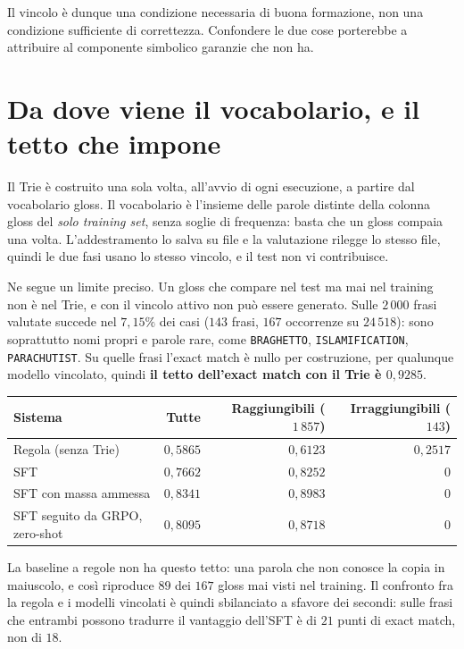 Il vincolo è dunque una condizione necessaria di buona formazione, non una
condizione sufficiente di correttezza. Confondere le due cose porterebbe a
attribuire al componente simbolico garanzie che non ha.

\section{Da dove viene il vocabolario, e il tetto che impone}
\label{sec:tetto-vocabolario}

Il Trie è costruito una sola volta, all'avvio di ogni esecuzione, a partire dal
vocabolario gloss. Il vocabolario è l'insieme delle parole distinte della colonna
gloss del \emph{solo training set}, senza soglie di frequenza: basta che un gloss
compaia una volta. L'addestramento lo salva su file e la valutazione rilegge lo
stesso file, quindi le due fasi usano lo stesso vincolo, e il test non vi
contribuisce.

Ne segue un limite preciso. Un gloss che compare nel test ma mai nel training non
è nel Trie, e con il vincolo attivo non può essere generato. Sulle $2\,000$ frasi
valutate succede nel $7{,}15\%$ dei casi ($143$ frasi, $167$ occorrenze su
$24\,518$): sono soprattutto nomi propri e parole rare, come \texttt{BRAGHETTO},
\texttt{ISLAMIFICATION}, \texttt{PARACHUTIST}. Su quelle frasi l'exact match è
nullo per costruzione, per qualunque modello vincolato, quindi \textbf{il tetto
dell'exact match con il Trie è $0{,}9285$}.

\begin{center}
\begin{tabular}{lrrr}
\toprule
Sistema & Tutte & Raggiungibili ($1\,857$) & Irraggiungibili ($143$) \\
\midrule
Regola (senza Trie) & $0{,}5865$ & $0{,}6123$ & $0{,}2517$ \\
SFT & $0{,}7662$ & $0{,}8252$ & $0$ \\
SFT con massa ammessa & $0{,}8341$ & $0{,}8983$ & $0$ \\
SFT seguito da GRPO, zero-shot & $0{,}8095$ & $0{,}8718$ & $0$ \\
\bottomrule
\end{tabular}
\end{center}

La baseline a regole non ha questo tetto: una parola che non conosce la copia in
maiuscolo, e così riproduce $89$ dei $167$ gloss mai visti nel training. Il
confronto fra la regola e i modelli vincolati è quindi sbilanciato a sfavore dei
secondi: sulle frasi che entrambi possono tradurre il vantaggio dell'SFT è di
$21$ punti di exact match, non di $18$.

